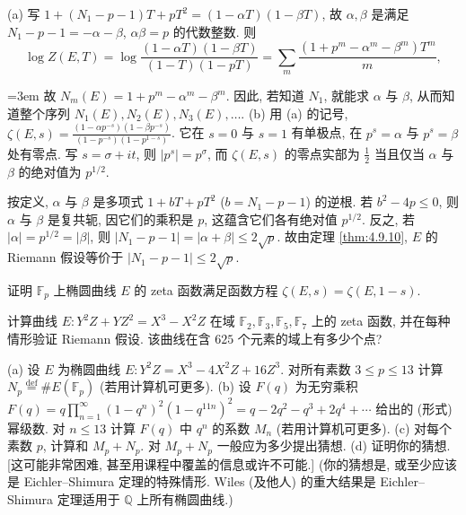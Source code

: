 \begin{remark} \label{thm:4.9.11} 
(a) 写 $1 + (N_1 - p - 1)T + pT^2 = (1-\alpha T)(1-\beta T)$, 故 $\alpha, \beta$ 是满足 $N_1 - p - 1 = -\alpha - \beta$, $\alpha\beta = p$ 的代数整数. 则
\[
\log Z(E, T) = \log\frac{(1-\alpha T)(1-\beta T)}{(1-T)(1-pT)} = \sum_m\frac{(1 + p^m - \alpha^m - \beta^m)T^m}{m},
\]
{\emergencystretch=3em 故 $N_m(E) = 1 + p^m - \alpha^m - \beta^m$. 因此, 若知道 $N_1$, 就能求 $\alpha$ 与 $\beta$, 从而知道整个序列 $N_1(E), N_2(E), N_3(E), \dots$.
(b) 用 (a) 的记号, $\zeta(E, s) = \frac{(1-\alpha p^{-s})(1-\beta p^{-s})}{(1-p^{-s})(1-p^{1-s})}$. 它在 $s = 0$ 与 $s = 1$ 有单极点, 在 $p^s = \alpha$ 与 $p^s = \beta$ 处有零点. 写 $s = \sigma + it$, 则 $|p^s| = p^\sigma$, 而 $\zeta(E, s)$ 的零点实部为 $\frac{1}{2}$ 当且仅当 $\alpha$ 与 $\beta$ 的绝对值为 $p^{1/2}$.\par}
\end{remark}

按定义, $\alpha$ 与 $\beta$ 是多项式 $1 + bT + pT^2$ ($b = N_1 - p - 1$) 的逆根. 若 $b^2 - 4p\le 0$, 则 $\alpha$ 与 $\beta$ 是复共轭, 因它们的乘积是 $p$, 这蕴含它们各有绝对值 $p^{1/2}$. 反之, 若 $|\alpha| = p^{1/2} = |\beta|$, 则 $|N_1 - p - 1| = |\alpha + \beta|\le 2\sqrt{p}$. 故由定理 \ref{thm:4.9.10}, $E$ 的 Riemann 假设等价于 $|N_1 - p - 1|\le 2\sqrt{p}$.

\begin{exercise} \label{thm:4.9.12} 
证明 $\mathbb{F}_p$ 上椭圆曲线 $E$ 的 zeta 函数满足函数方程 $\zeta(E, s) = \zeta(E, 1-s)$.
\end{exercise}

\begin{exercise} \label{thm:4.9.13} 
计算曲线 $E\colon Y^2Z + YZ^2 = X^3 - X^2Z$ 在域 $\mathbb{F}_2, \mathbb{F}_3, \mathbb{F}_5, \mathbb{F}_7$ 上的 zeta 函数, 并在每种情形验证 Riemann 假设. 该曲线在含 $625$ 个元素的域上有多少个点?
\end{exercise}

\begin{exercise} \label{thm:4.9.14} 
(a) 设 $E$ 为椭圆曲线 $E\colon Y^2Z = X^3 - 4X^2Z + 16Z^3$. 对所有素数 $3\le p\le 13$ 计算 $N_p \overset{\text{def}}{=} \#E(\mathbb{F}_p)$ (若用计算机可更多).
(b) 设 $F(q)$ 为无穷乘积 $F(q) = q\prod_{n=1}^{\infty}(1-q^n)^2(1-q^{11n})^2 = q - 2q^2 - q^3 + 2q^4 + \cdots$ 给出的 (形式) 幂级数. 对 $n\le 13$ 计算 $F(q)$ 中 $q^n$ 的系数 $M_n$ (若用计算机可更多).
(c) 对每个素数 $p$, 计算和 $M_p + N_p$. 对 $M_p + N_p$ 一般应为多少提出猜想.
(d) 证明你的猜想. [这可能非常困难, 甚至用课程中覆盖的信息或许不可能.] (你的猜想是, 或至少应该是 Eichler--Shimura 定理的特殊情形. Wiles (及他人) 的重大结果是 Eichler--Shimura 定理适用于 $\mathbb{Q}$ 上所有椭圆曲线.)
\end{exercise}

